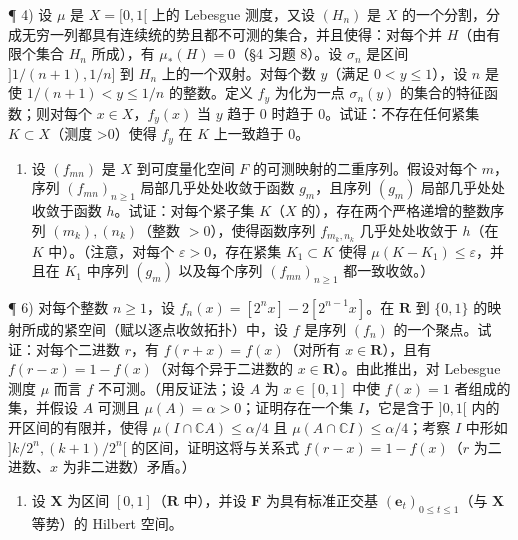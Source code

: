 ¶ 4) 设 \(\mu\) 是 \(X = [0,1[\) 上的 Lebesgue 测度，又设 \((H_n)\) 是 \(X\) 的一个分割，分成无穷一列都具有连续统的势且都不可测的集合，并且使得：对每个并 \(H\)（由有限个集合 \(H_n\) 所成），有 \(\mu_*(H) = 0\)（§4 习题 8）。设 \(\sigma_n\) 是区间 \(]1/(n+1),1/n]\) 到 \(H_n\) 上的一个双射。对每个数 \(y\)（满足 \(0 < y \leqslant 1\)），设 \(n\) 是使 \(1/(n+1) < y \leqslant 1/n\) 的整数。定义 \(f_y\) 为化为一点 \(\sigma_n(y)\) 的集合的特征函数；则对每个 \(x \in X\)，\(f_y(x)\) 当 \(y\) 趋于 0 时趋于 0。试证：不存在任何紧集 \(K \subset X\)（测度 \textgreater0）使得 \(f_y\) 在 \(K\) 上一致趋于 0。

\begin{enumerate}
\def\labelenumi{\arabic{enumi})}
\setcounter{enumi}{4}
\tightlist
\item
  设 \((f_{mn})\) 是 \(X\) 到可度量化空间 \(F\) 的可测映射的二重序列。假设对每个 \(m\)，序列 \((f_{mn})_{n\geqslant 1}\) 局部几乎处处收敛于函数 \(g_{m}\)，且序列 \((g_{m})\) 局部几乎处处收敛于函数 \(h\)。试证：对每个紧子集 \(K\)（\(X\) 的），存在两个严格递增的整数序列 \((m_k),(n_k)\)（整数 \(>0\)），使得函数序列 \(f_{m_k,n_k}\) 几乎处处收敛于 \(h\)（在 \(K\) 中）。（注意，对每个 \(\varepsilon >0\)，存在紧集 \(K_1\subset K\) 使得 \(\mu (K - K_1)\leqslant \varepsilon\)，并且在 \(K_{1}\) 中序列 \((g_{m})\) 以及每个序列 \((f_{mn})_{n\geqslant 1}\) 都一致收敛。）
\end{enumerate}

¶ 6) 对每个整数 \(n \geqslant 1\)，设 \(f_n(x) = [2^n x] - 2[2^{n-1}x]\)。在 \(\mathbf{R}\) 到 \(\{0,1\}\) 的映射所成的紧空间（赋以逐点收敛拓扑）中，设 \(f\) 是序列 \((f_n)\) 的一个聚点。试证：对每个二进数 \(r\)，有 \(f(r+x) = f(x)\)（对所有 \(x \in \mathbf{R}\)），且有 \(f(r-x) = 1 - f(x)\)（对每个异于二进数的 \(x \in \mathbf{R}\)）。由此推出，对 Lebesgue 测度 \(\mu\) 而言 \(f\) 不可测。（用反证法；设 \(A\) 为 \(x \in [0,1]\) 中使 \(f(x) = 1\) 者组成的集，并假设 \(A\) 可测且 \(\mu(A) = \alpha > 0\)；证明存在一个集 \(I\)，它是含于 \(]0,1[\) 内的开区间的有限并，使得 \(\mu(I \cap \mathbb{C}A) \leqslant \alpha/4\) 且 \(\mu(A \cap \mathbb{C}I) \leqslant \alpha/4\)；考察 \(I\) 中形如 \(]k/2^n, (k+1)/2^n[\) 的区间，证明这将与关系式 \(f(r-x) = 1 - f(x)\)（\(r\) 为二进数、\(x\) 为非二进数）矛盾。）

\begin{enumerate}
\def\labelenumi{\arabic{enumi})}
\setcounter{enumi}{6}
\tightlist
\item
  设 \(\mathbf{X}\) 为区间 \([0,1]\)（\(\mathbf{R}\) 中），并设 \(\mathbf{F}\) 为具有标准正交基 \((\mathbf{e}_t)_{0\leqslant t\leqslant 1}\)（与 \(\mathbf{X}\) 等势）的 Hilbert 空间。
\end{enumerate}

